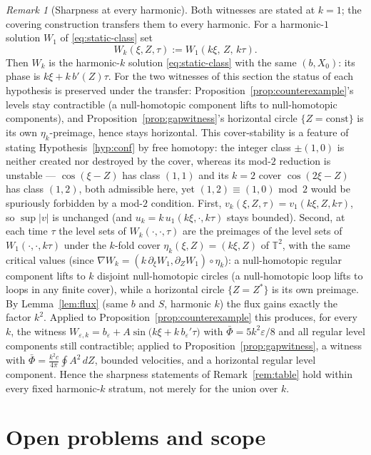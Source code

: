 \documentclass[11pt]{amsart}
\theoremstyle{definition}
\theoremstyle{remark}
\newtheorem{remark}[theorem]{Remark}
\newcommand{\T}{\mathbb{T}}
\newcommand{\Fbar}{\bar\Phi}
\begin{document}
\begin{remark}[Sharpness at every harmonic]\label{rem:sharpness-k}
Both witnesses are stated at $k=1$; the covering construction transfers
them to every harmonic. For a harmonic-$1$ solution $W_1$ of
\eqref{eq:static-class} set
\[
  W_k(\xi,Z,\tau):=W_1(k\xi,\,Z,\,k\tau).
\]
Then $W_k$ is the harmonic-$k$ solution \eqref{eq:static-class} with
the same $(b,X_0)$: its phase is $k\xi+k\,b'(Z)\tau$. For the two
witnesses of this section the status of each hypothesis is preserved
under the transfer: Proposition~\ref{prop:counterexample}'s levels stay
contractible (a null-homotopic component lifts to null-homotopic
components), and Proposition~\ref{prop:gapwitness}'s horizontal circle
$\{Z=\mathrm{const}\}$ is its own $\eta_k$-preimage, hence stays
horizontal. This cover-stability is a feature of stating
Hypothesis~\ref{hyp:conf} by free homotopy: the integer class $\pm(1,0)$
is neither created nor destroyed by the cover, whereas its mod-$2$
reduction is unstable --- $\cos(\xi-Z)$ has class $(1,1)$ and its $k=2$
cover $\cos(2\xi-Z)$ has class $(1,2)$, both admissible here, yet
$(1,2)\equiv(1,0)$ mod~$2$ would be spuriously forbidden by a mod-$2$
condition. First,
$v_k(\xi,Z,\tau)=v_1(k\xi,Z,k\tau)$, so $\sup|v|$ is unchanged (and
$u_k=k\,u_1(k\xi,\cdot,k\tau)$ stays bounded). Second, at each time
$\tau$ the level sets of $W_k(\cdot,\cdot,\tau)$ are the preimages of
the level sets of $W_1(\cdot,\cdot,k\tau)$ under the $k$-fold cover
$\eta_k(\xi,Z)=(k\xi,Z)$ of $\T^2$, with the same critical values
(since $\nabla W_k=(k\,\partial_\xi W_1,\partial_ZW_1)\circ\eta_k$): a
null-homotopic regular component lifts to $k$ disjoint null-homotopic
circles (a null-homotopic loop lifts to loops in any finite cover),
while a horizontal circle $\{Z=Z^*\}$ is its own preimage. By
Lemma~\ref{lem:flux} (same $b$ and $S$, harmonic $k$) the flux gains
exactly the factor $k^2$. Applied to
Proposition~\ref{prop:counterexample} this produces, for every $k$, the
witness
$W_{\varepsilon,k}=b_\varepsilon+A\sin\bigl(k\xi+k\,b_\varepsilon'\tau\bigr)$
with $\Fbar=5k^2\varepsilon/8$ and all regular level components still
contractible; applied to Proposition~\ref{prop:gapwitness}, a witness
with $\Fbar=\frac{k^2c}{4\pi}\oint A^2\,dZ$, bounded velocities, and a
horizontal regular level component. Hence the sharpness statements of
Remark~\ref{rem:table} hold within every fixed harmonic-$k$ stratum,
not merely for the union over $k$.
\end{remark}

\section{Open problems and scope}\label{sec:open}
\end{document}
